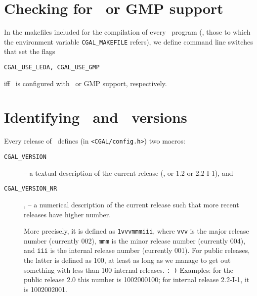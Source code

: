 \section{Checking for \leda\ or GMP support}
\label{sec:leda_gmp_support}

In the makefiles included for the compilation of every \cgal\ program
(\ie, those to which the environment variable {\tt CGAL\_MAKEFILE} refers),
we define command line switches that set the flags 
\begin{verbatim}
CGAL_USE_LEDA, CGAL_USE_GMP
\end{verbatim}
iff \cgal\ is configured with \leda\ or GMP support, respectively.

\section{Identifying \cgal\ and \leda\ versions}
\label{sec:which_versions}

Every release of \cgal\ defines (in \texttt{<CGAL/config.h>}) two
macros:
\begin{description}
\item[\texttt{CGAL\_VERSION}]
     -- a textual description of the
     current release (\eg, or 1.2 or 2.2-I-1), and 
\item[\texttt{CGAL\_VERSION\_NR}], 
     --  a numerical description of
     the current release such that more recent releases have higher
     number.

     More precisely, it is defined as \texttt{1vvvmmmiii},
     where \texttt{vvv} is the major release number (currently 002),
     \texttt{mmm} is the minor release number (currently 004), and
     \texttt{iii} is the internal release number (currently 001). For
     public releases, the latter is defined as 100, at least as long as we
     manage to get out something with less than 100 internal releases.
     \texttt{:-)} Examples: for the public release 2.0 this number is 
     1002000100; for internal release 2.2-I-1, it is 1002002001.
\end{description}
 
